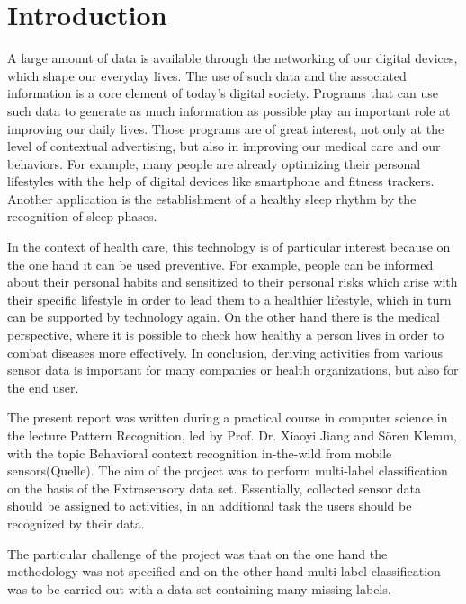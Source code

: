 \section{Introduction}
A large amount of data is available through the networking of our digital devices, which shape our everyday lives. The use of such data and the associated information is a core element of today's digital society. Programs that can use such data to generate as much information as possible play an important role at improving our daily lives. Those programs are of great interest, not only at the level of contextual advertising, but also in improving our medical care and our behaviors. For example, many people are already optimizing their personal lifestyles with the help of digital devices like smartphone and fitness trackers. Another application is the establishment of a healthy sleep rhythm by the recognition of sleep phases. 

In the context of health care, this technology is of particular interest because on the one hand it can be used preventive. For example, people can be informed about their personal habits and sensitized to their personal risks which arise with their specific lifestyle in order to lead them to a healthier lifestyle, which in turn can be supported by technology again. On the other hand there is the medical perspective, where it is possible to check how healthy a person lives in order to combat diseases more effectively. In conclusion, deriving activities from various sensor data is important for many companies or health organizations, but also for the end user.

The present report was written during a practical course in computer science in the lecture Pattern Recognition, led by Prof. Dr. Xiaoyi Jiang and Sören Klemm, with the topic \gl Behavioral context recognition in-the-wild from mobile sensors\gr (Quelle). The aim of the project was to perform multi-label classification on the basis of the Extrasensory data set. Essentially, collected sensor data should be assigned to activities, in an additional task the users should be recognized by their data. 

The particular challenge of the project was that on the one hand the methodology was not specified and on the other hand multi-label classification was to be carried out with a data set containing many missing labels. 